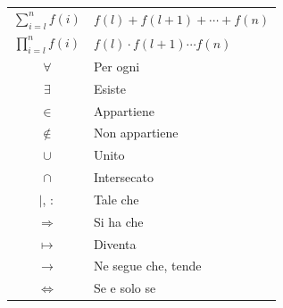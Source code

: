 \documentclass[8pt, a4paper, twocolumn]{extarticle}
\begin{document}
\begin{tabular}{c | M{6cm}}
	$\sum\limits_{i = l}^{n} f(i)$ & $f(l) + f(l+1) + \dotsb + f(n)$\\
	$\prod\limits_{i = l}^{n} f(i)$ & $f(l) \cdot f(l+1) \dotsm f(n)$\\
	$\forall$ & Per ogni\\
	$\exists$ & Esiste\\
	$\in$ & Appartiene\\
	$\not\in$ & Non appartiene\\
	$\cup$ & Unito\\
	$\cap$ & Intersecato\\
	$\mid$, $:$ & Tale che\\
	$\Rightarrow$ & Si ha che\\
	$\mapsto$ & Diventa\\
	$\rightarrow$ & Ne segue che, tende\\
	$\iff$ & Se e solo se
\end{tabular}























\newpage
\listoftodos[Note]
\end{document}
